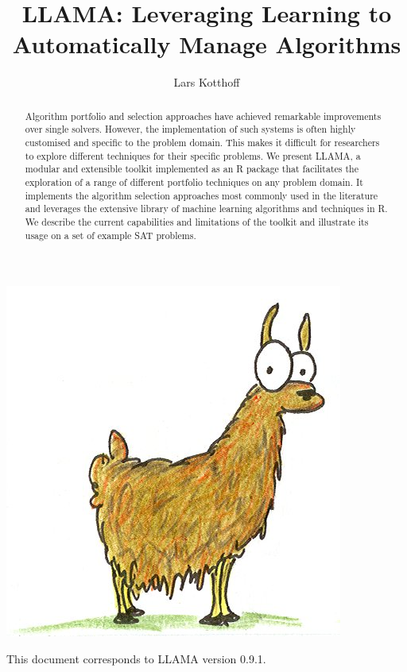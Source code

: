 \documentclass{article}
\title{LLAMA: Leveraging Learning to Automatically Manage Algorithms}
\author{Lars Kotthoff}
\date{}
\begin{document}
\begin{titlepage}

\maketitle
\thispagestyle{empty}

\begin{center}
\includegraphics[width=.5\textwidth]{llama.jpg}
\end{center}

\begin{abstract}
Algorithm portfolio and selection approaches have achieved remarkable
improvements over single solvers. However, the implementation of such systems is
often highly customised and specific to the problem domain. This makes it
difficult for researchers to explore different techniques for their specific
problems. We present LLAMA, a modular and extensible toolkit implemented as an R
package that facilitates the exploration of a range of different portfolio
techniques on any problem domain. It implements the algorithm selection
approaches most commonly used in the literature and leverages the extensive
library of machine learning algorithms and techniques in R. We describe the
current capabilities and limitations of the toolkit and illustrate its usage on
a set of example SAT problems.
\end{abstract}


\begin{center}
This document corresponds to LLAMA version 0.9.1.
\end{center}

\end{titlepage}


\renewenvironment{knitrout}{\setlength{\topsep}{0mm}}{}
\end{document}
